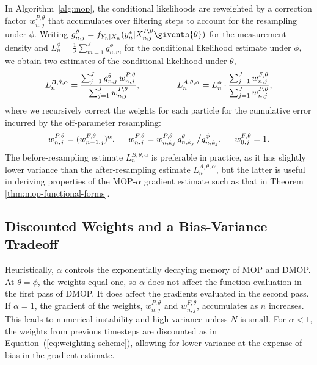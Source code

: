 \documentclass[numsec,webpdf,modern,medium,namedate]{oup-authoring-template}
\newcommand\arxiv[2]{#1}
\begin{document}
In Algorithm~\ref{alg:mop}, the conditional likelihoods are reweighted by a correction factor $w^{P,\theta}_{n,j}$ that accumulates over filtering steps to account for the resampling under $\phi$. 
Writing $g^{\theta}_{n,j}={f}_{{Y}_{n}|{X}_{n}}(y_{n}^{*}|{X}_{n,j}^{P,\theta}\giventh{\theta})$ for the measurement density and $L_n^{\phi} = \frac{1}{J}\sum_{m=1}^{J}g^{\phi}_{n,m}$ for the conditional likelihood estimate under $\phi$, we obtain two estimates of the conditional likelihood under $\theta$,
\begin{equation}
     \label{eq:mop-conditional-likelihood}
     L_n^{B,\theta,\alpha} = \frac{\sum_{j=1}^Jg^\theta_{n,j}\, w^{P,\theta}_{n,j}}{\sum_{j=1}^J  w^{P,\theta}_{n,j}}, \arxiv{\hspace{15mm}}{\;\;}
     L_n^{A,\theta,\alpha} = L_n^\phi\cdot \frac{\sum_{j=1}^J w^{F,\theta}_{n,j}}{\sum_{j=1}^J  w^{P,\theta}_{n,j}},
\end{equation}
where we recursively correct the weights for each particle for the cumulative error incurred by the off-parameter resampling:
\begin{equation}
    \label{eq:weighting-scheme}
    w_{n,j}^{P,\theta} = (w_{n-1,j}^{F,\theta})^\alpha, 
    \arxiv{\hspace{5mm}}{\;}
    w^{F,\theta}_{n,j} = w^{P,\theta}_{n,k_j} \, g^{\theta}_{n,k_j} \, \big/ g^{\phi}_{n,k_j}, 
    \arxiv{\hspace{5mm}}{\;}
    w^{F,\theta}_{0,j}= 1.
\end{equation}
The before-resampling estimate $L_n^{B,\theta,\alpha}$ is preferable in practice, as it has slightly lower variance than the after-resampling estimate $L_n^{A,\theta,\alpha}$, but the latter is useful in deriving properties of the MOP-$\alpha$ gradient estimate such as that in Theorem \ref{thm:mop-functional-forms}.


\subsection{Discounted Weights and a Bias-Variance Tradeoff}

Heuristically, $\alpha$ controls the exponentially decaying memory of MOP and DMOP.
At $\theta=\phi$, the weights equal one, so $\alpha$ does not affect the function evaluation in the first pass of DMOP. It does affect the gradients evaluated in the second pass.
If $\alpha=1$, the gradient of the weights, $w^{P,\theta}_{n,j}$ and $w^{F,\theta}_{n,j}$, accumulates as $n$ increases.
This leads to numerical instability and high variance unless $N$ is small.
For $\alpha<1$, the weights from previous timesteps are discounted as in Equation~(\ref{eq:weighting-scheme}), allowing for lower variance at the expense of bias in the gradient estimate.
\end{document}
